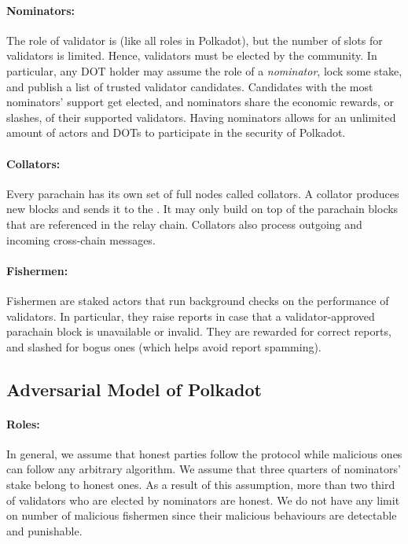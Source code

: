 \paragraph{Nominators:} The role of validator is 
 (like all roles in Polkadot),
but the number of slots for validators is limited. Hence, validators must be elected by the community.
In particular, any DOT holder may assume the role of a \emph{nominator}, lock some stake, and publish a list
of trusted validator candidates. Candidates with the most nominators' support get elected,
and nominators share the economic rewards, or slashes, of their supported validators.
Having nominators allows for an unlimited amount of actors and DOTs to participate in the security of Polkadot.

\paragraph{Collators: } Every parachain has its own set of full nodes called collators.
A collator produces new blocks and sends it to the .
It may only build on top of the parachain blocks that are referenced in the relay chain.
Collators also process outgoing and incoming cross-chain messages.

\paragraph{Fishermen:} Fishermen are staked actors that run background checks on the performance of validators.
In particular, they raise reports in case that a validator-approved parachain block is unavailable or invalid.
They are rewarded for correct reports, and slashed for bogus ones (which helps avoid report spamming).


\subsection{Adversarial Model of Polkadot}

\paragraph{Roles:} In general, we assume that honest parties follow the protocol while malicious ones can follow any arbitrary algorithm. We assume that three quarters of nominators' stake belong to honest ones. As a result of this assumption, more than two third of validators who are elected by nominators are honest. We do not have any limit on number of malicious fishermen since their malicious behaviours are detectable and punishable.  

